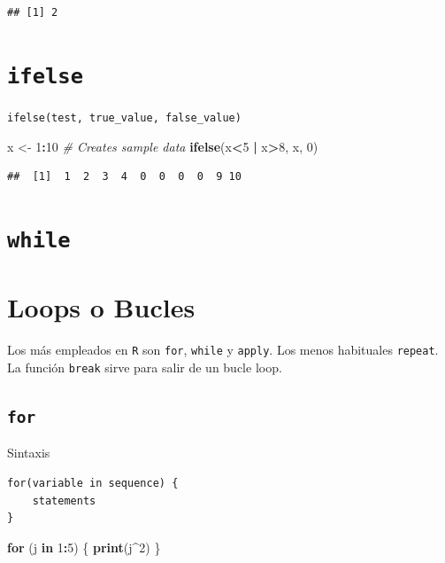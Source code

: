 \documentclass[]{book}
\newenvironment{Shaded}{\begin{snugshade}}{\end{snugshade}}
\newcommand{\KeywordTok}[1]{\textcolor[rgb]{0.13,0.29,0.53}{\textbf{#1}}}
\newcommand{\DecValTok}[1]{\textcolor[rgb]{0.00,0.00,0.81}{#1}}
\newcommand{\StringTok}[1]{\textcolor[rgb]{0.31,0.60,0.02}{#1}}
\newcommand{\CommentTok}[1]{\textcolor[rgb]{0.56,0.35,0.01}{\textit{#1}}}
\newcommand{\ControlFlowTok}[1]{\textcolor[rgb]{0.13,0.29,0.53}{\textbf{#1}}}
\newcommand{\OperatorTok}[1]{\textcolor[rgb]{0.81,0.36,0.00}{\textbf{#1}}}
\newcommand{\NormalTok}[1]{#1}
\begin{document}
\begin{verbatim}
## [1] 2
\end{verbatim}

\section{\texorpdfstring{\texttt{ifelse}}{ifelse}}\label{ifelse}

\texttt{ifelse(test,\ true\_value,\ false\_value)}

\begin{Shaded}
\begin{Highlighting}[]
\NormalTok{x <-}\StringTok{ }\DecValTok{1}\OperatorTok{:}\DecValTok{10} \CommentTok{# Creates sample data}
\KeywordTok{ifelse}\NormalTok{(x}\OperatorTok{<}\DecValTok{5} \OperatorTok{|}\StringTok{ }\NormalTok{x}\OperatorTok{>}\DecValTok{8}\NormalTok{, x, }\DecValTok{0}\NormalTok{)}
\end{Highlighting}
\end{Shaded}

\begin{verbatim}
##  [1]  1  2  3  4  0  0  0  0  9 10
\end{verbatim}

\section{\texorpdfstring{\texttt{while}}{while}}\label{while}

\section{Loops o Bucles}\label{loops-o-bucles}

Los más empleados en \texttt{R} son \texttt{for}, \texttt{while} y
\texttt{apply}. Los menos habituales \texttt{repeat}. La función
\texttt{break} sirve para salir de un bucle loop.

\subsection{\texorpdfstring{\texttt{for}}{for}}\label{for}

Sintaxis

\begin{verbatim}
for(variable in sequence) {
    statements
}
\end{verbatim}

\begin{Shaded}
\begin{Highlighting}[]
\ControlFlowTok{for}\NormalTok{ (j }\ControlFlowTok{in} \DecValTok{1}\OperatorTok{:}\DecValTok{5}\NormalTok{)}
\NormalTok{\{}
  \KeywordTok{print}\NormalTok{(j}\OperatorTok{^}\DecValTok{2}\NormalTok{)}
\NormalTok{\}}
\end{Highlighting}
\end{Shaded}
\end{document}
